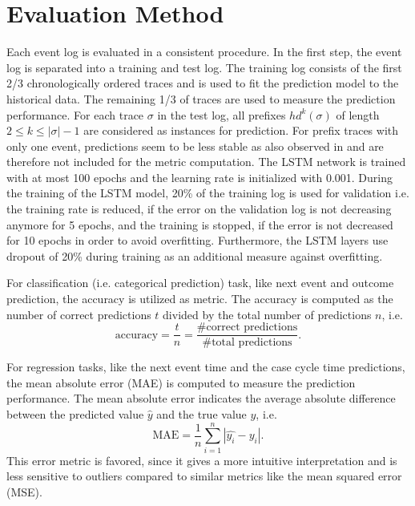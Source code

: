 \section{Evaluation Method}

Each event log is evaluated in a consistent procedure.
In the first step, the event log is separated into a training and test log. 
The training log consists of the first 2/3 chronologically ordered traces and is used to fit the prediction model to the historical data.
The remaining 1/3 of traces are used to measure the prediction performance.
For each trace $\sigma$ in the test log, all prefixes $hd^k(\sigma)$ of length $2 \leq k \leq |\sigma| - 1$ are considered as instances for prediction.
For prefix traces with only one event, predictions seem to be less stable as also observed in \cite{DBLP:conf/caise/TaxVRD17} and are therefore not included for the metric computation.
The LSTM network is trained with at most 100 epochs and the learning rate is initialized with 0.001.
During the training of the LSTM model, 20\% of the training log is used for validation i.e. the training rate is reduced, if the error on the validation log is not decreasing anymore for 5 epochs, and the training is stopped, if the error is not decreased for 10 epochs in order to avoid overfitting.
Furthermore, the LSTM layers use dropout \cite{DBLP:journals/corr/abs-1207-0580} of 20\% during training as an additional measure against overfitting.

For classification (i.e. categorical prediction) task, like next event and outcome prediction, the accuracy is utilized as metric.
The accuracy is computed as the number of correct predictions $t$ divided by the total number of predictions $n$, i.e. 
\begin{equation*}
	\textrm{accuracy} = \dfrac{t}{n} = \dfrac{\textrm{\# correct predictions}}{\textrm{\# total predictions}}.
\end{equation*}

For regression tasks, like the next event time and the case cycle time predictions, the mean absolute error (MAE) is computed to measure the prediction performance. The mean absolute error indicates the average absolute difference between the predicted value $\hat{y}$ and the true value $y$,  i.e.
\begin{equation*}
	\textrm{MAE} = \dfrac{1}{n}\sum_{i=1}^{n}|\hat{y_i} - y_i|.
\end{equation*}
This error metric is favored, since it gives a more intuitive interpretation and is less sensitive to outliers compared to similar metrics like the mean squared error (MSE).


